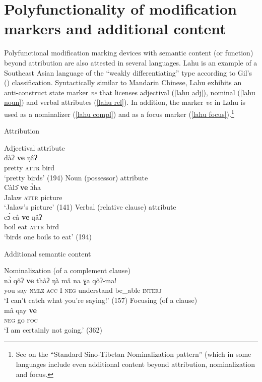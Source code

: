 \section[Polyfunctionality and additional content]{Polyfunctionality of modification markers and additional content}
Polyfunctional modification marking devices with semantic content (or function) beyond attribution are also attested in several languages. Lahu is an example of a Southeast Asian language of the “weakly differentiating” type according to Gil's (\citeyear{gil2005}) classification. Syntactically similar to Mandarin Chinese, Lahu exhibits an anti\hyp{}construct state marker \textit{ve} that licenses adjectival (\ref{lahu adj}), nominal (\ref{lahu noun}) and verbal attributes (\ref{lahu rel}). In addition, the marker \textit{ve} in Lahu is used as a nominalizer (\ref{lahu compl}) and as a focus marker (\ref{lahu focus}).\footnote{See \citealt{bickel1999} on the “Standard Sino-Tibetan Nominalization pattern” (which in some languages include even additional content beyond attribution, nominalization and focus.}
\begin{exe}
\ex
{}
\begin{xlist}
\ex	\rm{Attribution}
\begin{xlist}
\ex	\rm{Adjectival attribute}\\
\label{lahu adj}
\gll	dàʔ	\textbf{ve}	ŋâʔ\\
	pretty	\textsc{attr}	bird\\
\glt	‘pretty birds’ (194)
\ex	\rm{Noun (possessor) attribute}\\
\label{lahu noun}
\gll	Càl\^{ɔ}	\textbf{ve}	\`{ɔ}ha\\
	Jalaw	\textsc{attr}	picture\\
\glt	‘Jalaw's picture’ (141)
\ex	\rm{Verbal (relative clause) attribute}\\
\label{lahu rel}
\gll	c\'{ɔ}	câ	\textbf{ve}	ŋâʔ\\
	boil	eat	\textsc{attr}	bird\\
\glt	‘birds one boils to eat’ (194)
\end{xlist}
\ex	\rm{Additional semantic content}
\begin{xlist}
\ex \rm{Nominalization (of a complement clause)}\\
\label{lahu compl}
\gll	n\`{ɔ}	qôʔ \textbf{ve}	thàʔ	ŋà mâ	na ɣa	qôʔ-ma!\\
	you	say \textsc{nmlz}	\textsc{acc} I	\textsc{neg} understand	be\_able	\textsc{interj}\\
\glt	‘I can't catch what you're saying!’ (157)
\ex	\rm{Focusing (of a clause)}\\
\label{lahu focus}
\gll	mâ		qay	\textbf{ve}\\
	\textsc{neg}	go	\textsc{foc}\\
\glt	‘I am certainly not going.’ (362)
\end{xlist}
\end{xlist}
\end{exe}
